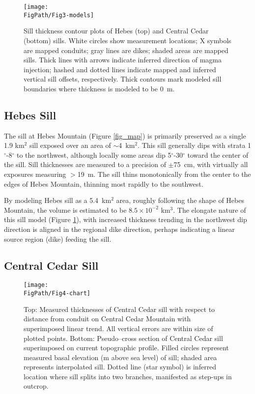 \begin{figure}
\centering
\texttt{[image: \\FigPath/Fig3-models]}
\caption[Sill thickness contour plots of Hebes and Central Cedar sills]{Sill thickness contour plots of Hebes (top) and Central Cedar (bottom) sills. White circles show measurement locations; X symbols are mapped conduits; gray lines are dikes; shaded areas are mapped sills. Thick lines with arrows indicate inferred direction of magma injection; hashed and dotted lines indicate mapped and inferred vertical sill offsets, respectively. Thick contours mark modeled sill boundaries where thickness is modeled to be 0~m.}
\label{fig_twomodels}
\end{figure}

\subsection{Hebes Sill}

The sill at Hebes Mountain (Figure \ref{fig_map}) is primarily preserved as a single 1.9 km$^2$ sill exposed over an area of $\sim$4~km$^2$. This sill generally dips with strata 1$^{\circ}$-8$^{\circ}$ to the northwest, although locally some areas dip 5$^{\circ}$-30$^{\circ}$ toward the center of the sill. Sill thicknesses are measured to a precision of $\pm$75~cm, with virtually all exposures measuring $>$19~m. The sill thins monotonically from the center to the edges of Hebes Mountain, thinning most rapidly to the southwest.

By modeling Hebes sill as a 5.4~km$^2$ area, roughly following the shape of Hebes Mountain, the volume is estimated to be $8.5\times 10^{-2}$ km$^3$. The elongate nature of this sill model (Figure \ref{fig_twomodels}), with increased thickness trending in the northwest dip direction is aligned in the regional dike direction, perhaps indicating a linear source region (dike) feeding the sill.

\subsection{Central Cedar Sill}

\begin{figure}
\centering
\texttt{[image: \\FigPath/Fig4-chart]}
\caption[Chart of measured thicknesses and elevations of Central Cedar sill]{Top: Measured thicknesses of Central Cedar sill with respect to distance from conduit on Central Cedar Mountain with superimposed linear trend. All vertical errors are within size of plotted points. Bottom: Pseudo–cross section of Central Cedar sill superimposed on current topographic profile. Filled circles represent measured basal elevation (m above sea level) of sill; shaded area represents interpolated sill. Dotted line (star symbol) is inferred location where sill splits into two branches, manifested as step-ups in outcrop.}
\label{fig_chart}
\end{figure}

